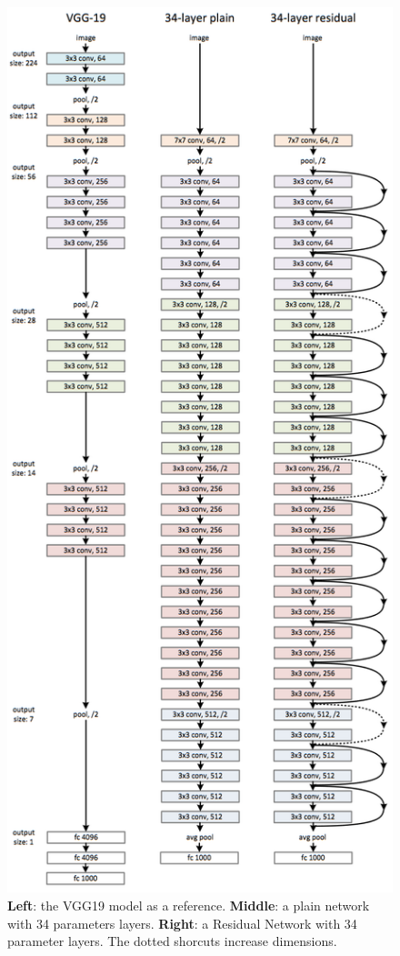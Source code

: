 \begin{figure}[p]
	\centering
	\includegraphics[height=0.9\textheight]{img/resnet34.png}
	\caption{\textbf{Left}: the VGG19 model as a reference. \textbf{Middle}: a plain network with 34 parameters layers. \textbf{Right}: a Residual Network with 34 parameter layers. The dotted shorcuts increase dimensions.}
	\label{fig:renet50}
\end{figure}
